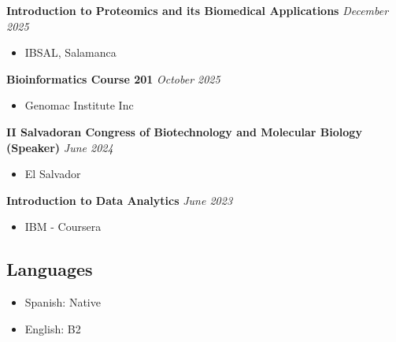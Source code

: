 \documentclass[a4paper,10pt]{article}
\begin{document}
\textbf{Introduction to Proteomics and its Biomedical Applications} \hfill \textit{December 2025}
\begin{itemize}
    \item IBSAL, Salamanca
\end{itemize}

\textbf{Bioinformatics Course 201} \hfill \textit{October 2025}
\begin{itemize}
    \item Genomac Institute Inc
\end{itemize}

\textbf{II Salvadoran Congress of Biotechnology and Molecular Biology (Speaker)} \hfill \textit{June 2024}
\begin{itemize}
    \item El Salvador
\end{itemize}

\textbf{Introduction to Data Analytics} \hfill \textit{June 2023}
\begin{itemize}
    \item IBM - Coursera
\end{itemize}

\subsection*{Languages}
\begin{itemize}
  \item Spanish: Native
  \item English: B2
\end{itemize}
\end{document}
